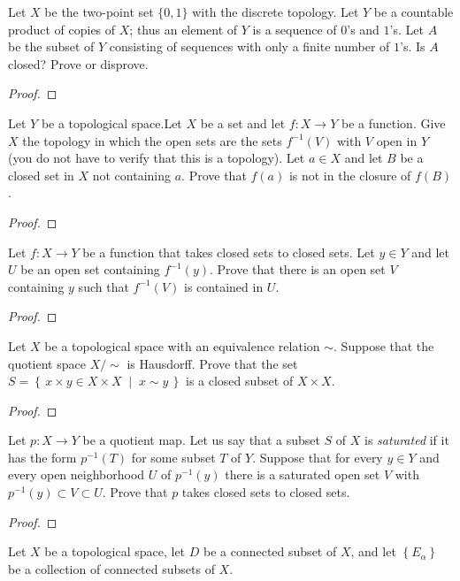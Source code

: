 \begin{problem}
Let $X$ be the two-point set $\{0,1\}$ with the discrete
topology. Let $Y$ be a countable product of copies of $X$; thus
an element of $Y$ is a sequence of $0$'s and $1$'s. Let $A$ be
the subset of $Y$ consisting of sequences with only a finite
number of $1$'s. Is $A$ closed? Prove or disprove.
\end{problem}
\begin{proof}
\end{proof}
\begin{problem}
Let $Y$ be a topological space.Let $X$ be a set and let $f\colon
X\to Y$ be a function. Give $X$ the topology in which the open
sets are the sets $f^{-1}(V)$ with $V$ open in $Y$ (you do not
have to verify that this is a topology). Let $a\in X$ and let $B$
be a closed set in $X$ not containing $a$. Prove that $f(a)$ is
not in the closure of $f(B)$.
\end{problem}
\begin{proof}
\end{proof}
\begin{problem}
Let $f\colon X\to Y$ be a function that takes closed sets to
closed sets. Let $y\in Y$ and let $U$ be an open set containing
$f^{-1}(y)$. Prove that there is an open set $V$ containing $y$
such that $f^{-1}(V)$ is contained in $U$.
\end{problem}
\begin{proof}
\end{proof}
\begin{problem}
Let $X$ be a topological space with an equivalence relation
$\sim$. Suppose that the quotient space $X/{\sim}$ is
Hausdorff. Prove that the set $S=\left\{\,x\times y\in X\times
  X\;\middle|\;x\sim y\,\right\}$ is a closed subset of $X\times
X$.
\end{problem}
\begin{proof}
\end{proof}
\begin{problem}
Let $p\colon X\to Y$ be a quotient map. Let us say that a subset
$S$ of $X$ is \emph{saturated} if it has the form $p^{-1}(T)$ for
some subset $T$ of $Y$. Suppose that for every $y\in Y$ and every
open neighborhood $U$ of $p^{-1}(y)$ there is a saturated open
set $V$ with $p^{-1}(y)\subset V\subset U$. Prove that $p$ takes
closed sets to closed sets.
\end{problem}
\begin{proof}
\end{proof}
\begin{problem}
Let $X$ be a topological space, let $D$ be a connected subset of
$X$, and let $\left\{E_\alpha\right\}$ be a collection of
connected subsets of $X$.
\end{problem}
